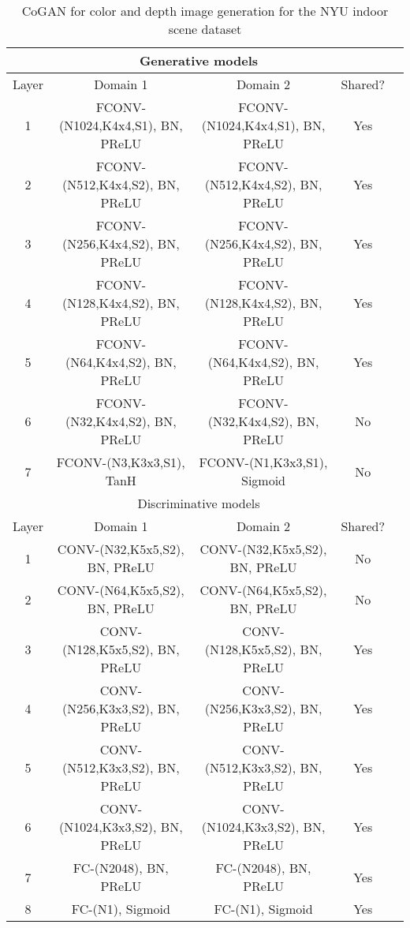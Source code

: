 \begin{table*}[thb!]
\small
\centering
{
\caption{CoGAN for color and depth image generation for the NYU indoor scene dataset}
\label{tbl::nyu_g}
\begin{tabular}{|c|c|c|c|c|}
\hline
\multicolumn{4}{|c|}{Generative models}\\
\hline\rule{0pt}{2ex}    
Layer &  Domain 1 & Domain 2 & Shared? \\
\hline
1 &  FCONV-(N1024,K4x4,S1), BN, PReLU & FCONV-(N1024,K4x4,S1), BN, PReLU & Yes\\
2 &  FCONV-(N512,K4x4,S2), BN, PReLU & FCONV-(N512,K4x4,S2), BN, PReLU & Yes\\
3 &  FCONV-(N256,K4x4,S2), BN, PReLU & FCONV-(N256,K4x4,S2), BN, PReLU & Yes\\
4 &  FCONV-(N128,K4x4,S2), BN, PReLU & FCONV-(N128,K4x4,S2), BN, PReLU & Yes\\
5 &  FCONV-(N64,K4x4,S2), BN, PReLU & FCONV-(N64,K4x4,S2), BN, PReLU & Yes\\
6 &  FCONV-(N32,K4x4,S2), BN, PReLU & FCONV-(N32,K4x4,S2), BN, PReLU & No\\
7 &  FCONV-(N3,K3x3,S1), TanH & FCONV-(N1,K3x3,S1), Sigmoid & No\\
\hline
\hline
\multicolumn{4}{|c|}{Discriminative models}\\
\hline\rule{0pt}{2ex} 
Layer &  Domain 1 & Domain 2 & Shared? \\
\hline
1 & CONV-(N32,K5x5,S2), BN, PReLU & CONV-(N32,K5x5,S2), BN, PReLU &No\\
2 & CONV-(N64,K5x5,S2), BN, PReLU & CONV-(N64,K5x5,S2), BN, PReLU &No\\
3 & CONV-(N128,K5x5,S2), BN, PReLU & CONV-(N128,K5x5,S2), BN, PReLU &Yes\\
4 & CONV-(N256,K3x3,S2), BN, PReLU & CONV-(N256,K3x3,S2), BN, PReLU &Yes\\
5 & CONV-(N512,K3x3,S2), BN, PReLU & CONV-(N512,K3x3,S2), BN, PReLU &Yes\\
6 & CONV-(N1024,K3x3,S2), BN, PReLU & CONV-(N1024,K3x3,S2), BN, PReLU &Yes\\
7 & FC-(N2048), BN, PReLU & FC-(N2048), BN, PReLU &Yes\\
8 & FC-(N1), Sigmoid & FC-(N1), Sigmoid &Yes\\
\hline
\end{tabular}
}
\end{table*}

\clearpage